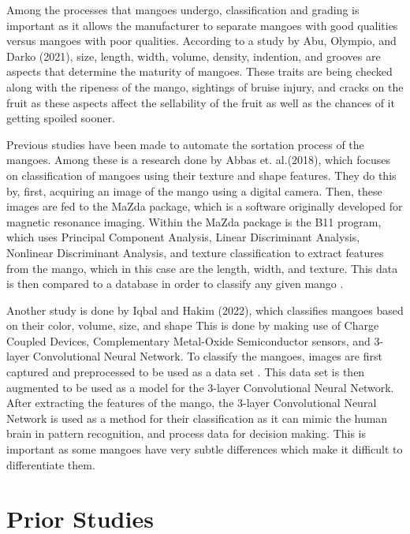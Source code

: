 Among the processes that mangoes undergo, classification and grading is important as it allows the manufacturer to separate mangoes with good qualities versus mangoes with poor qualities. According to a study by Abu, Olympio, and Darko (2021), size, length, width, volume, density, indention, and grooves are aspects that determine the maturity of mangoes. These traits are being checked along with the ripeness of the mango, sightings of bruise injury, and cracks on the fruit \cite{lacap-bruise-2021} as these aspects affect the sellability of the fruit as well as the chances of it getting spoiled sooner.

Previous studies have been made to automate the sortation process of the mangoes. Among these is a research done by Abbas et. al.(2018), which focuses on classification of mangoes using their texture and shape features. They do this by, first, acquiring an image of the mango using a digital camera. Then, these images are fed to the MaZda package, which is a software originally developed for magnetic resonance imaging. Within the MaZda package is the B11 program, which uses Principal Component Analysis, Linear Discriminant Analysis, Nonlinear Discriminant Analysis, and texture classification to extract features from the mango, which in this case are the length, width, and texture. This data is then compared to a database in order to classify any given mango \cite{abbas-mango-2018}.  

Another study is done by Iqbal and Hakim (2022), which classifies mangoes based on their color, volume, size, and shape This is done by making use of Charge Coupled Devices, Complementary Metal-Oxide Semiconductor sensors, and 3-layer Convolutional Neural Network. To classify the mangoes, images are first captured and preprocessed to be used as a data set \cite{rizwan-iqbal-classification-2022}. This data set is then augmented to be used as a model for the 3-layer Convolutional Neural Network. After extracting the features of the mango, the 3-layer Convolutional Neural Network is used as a method for their classification as it can mimic the human brain in pattern recognition, and process data for decision making. This is important as some mangoes have very subtle differences which make it difficult to differentiate them.



\section{Prior Studies}


